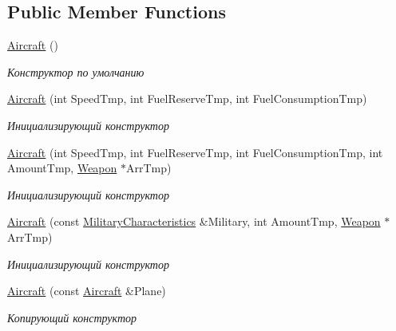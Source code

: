\subsection*{Public Member Functions}
\begin{DoxyCompactItemize}
\item 
\mbox{\label{class_aircraft_carrier_group_1_1_aircraft_a5972a286b5968e4239adb81e39cdc265}} 
\mbox{\hyperlink{class_aircraft_carrier_group_1_1_aircraft_a5972a286b5968e4239adb81e39cdc265}{Aircraft}} ()
\begin{DoxyCompactList}\small\item\em Конструктор по умолчанию \end{DoxyCompactList}\item 
\mbox{\hyperlink{class_aircraft_carrier_group_1_1_aircraft_a4e57cd1e9950eb18c1aa4ce3b6f55c8c}{Aircraft}} (int Speed\+Tmp, int Fuel\+Reserve\+Tmp, int Fuel\+Consumption\+Tmp)
\begin{DoxyCompactList}\small\item\em Инициализирующий конструктор \end{DoxyCompactList}\item 
\mbox{\hyperlink{class_aircraft_carrier_group_1_1_aircraft_addf184db93824c8a9762101740249781}{Aircraft}} (int Speed\+Tmp, int Fuel\+Reserve\+Tmp, int Fuel\+Consumption\+Tmp, int Amount\+Tmp, \mbox{\hyperlink{class_aircraft_carrier_group_1_1_weapon}{Weapon}} $\ast$Arr\+Tmp)
\begin{DoxyCompactList}\small\item\em Инициализирующий конструктор \end{DoxyCompactList}\item 
\mbox{\hyperlink{class_aircraft_carrier_group_1_1_aircraft_a14206f9c1eadff0e4b665eeb25f9f78f}{Aircraft}} (const \mbox{\hyperlink{class_aircraft_carrier_group_1_1_military_characteristics}{Military\+Characteristics}} \&Military, int Amount\+Tmp, \mbox{\hyperlink{class_aircraft_carrier_group_1_1_weapon}{Weapon}} $\ast$Arr\+Tmp)
\begin{DoxyCompactList}\small\item\em Инициализирующий конструктор \end{DoxyCompactList}\item 
\mbox{\hyperlink{class_aircraft_carrier_group_1_1_aircraft_ad519702e8d3b7057d6345adf708a1397}{Aircraft}} (const \mbox{\hyperlink{class_aircraft_carrier_group_1_1_aircraft}{Aircraft}} \&Plane)
\begin{DoxyCompactList}\small\item\em Копирующий конструктор \end{DoxyCompactList}\item 

\end{DoxyCompactItemize}
